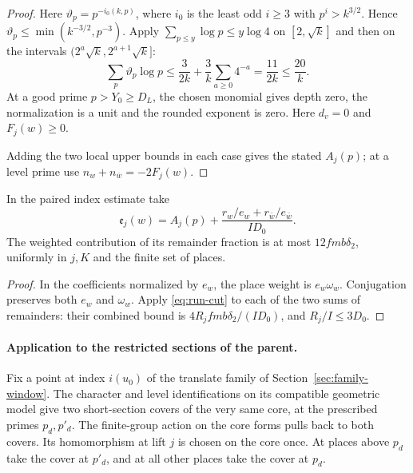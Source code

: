 \begin{proof}
Here \(\vartheta_p=p^{-i_0(k,p)}\), where \(i_0\) is the least
odd \(i\ge3\) with \(p^i>k^{3/2}\). Hence
\(\vartheta_p\le\min(k^{-3/2},p^{-3})\). Apply
\(\sum_{p\le y}\log p\le y\log4\) on \([2,\sqrt k]\) and then
on the intervals \((2^a\sqrt k,2^{a+1}\sqrt k]\):
\[
 \sum_p\vartheta_p\log p
 \le\frac{3}{2k}+\frac3k\sum_{a\ge0}4^{-a}
 =\frac{11}{2k}\le\frac{20}{k}.
\]
At a good
prime \(p>Y_0\ge D_L\), the chosen monomial gives depth zero, the normalization is a unit and the rounded
exponent is zero. Here \(d_v=0\) and \(F_j(w)\ge0\).
\label{cor:paired-row-indices-6}

Adding the two local upper bounds in each case gives the stated
\(A_j(p)\); at a level prime use \(n_w+n_{\bar w}=-2F_j(w)\).
\end{proof}

\begin{corollary}
In the paired index estimate take
\[
  \mathfrak e_j(w)=A_j(p)+
       \frac{r_w/e_w+r_{\bar w}/e_{\bar w}}{I D_0}.
\]
The weighted contribution of its remainder fraction is at most
\(12fmb\delta_2\), uniformly in \(j,K\) and the finite set of places.
\end{corollary}
\begin{proof}
In the coefficients normalized by \(e_w\), the place weight is
\(e_w\omega_w\). Conjugation preserves both \(e_w\) and \(\omega_w\).
Apply \eqref{eq:run-cut} to each of the two sums of remainders:
their combined bound is \(4R_jfmb\delta_2/(I D_0)\), and
\(R_j/I\le3D_0\).
\end{proof}

\paragraph{Application to the restricted sections of the parent.}
Fix a point at index \(i(u_0)\) of the translate family of
Section~\ref{sec:family-window}. The character and level
identifications on its compatible geometric model give two
short-section covers of the very same core, at the prescribed
primes \(p_d,p'_d\). The finite-group action on the core forms
pulls back to both covers. Its homomorphism at lift \(j\) is
chosen on the core once. At places above \(p_d\) take the cover
at \(p'_d\), and at all other places take the cover at \(p_d\).

